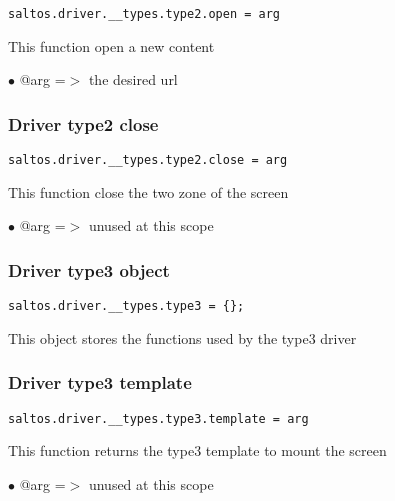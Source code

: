 \documentclass[a4paper]{article}
\begin{document}
\begin{lstlisting}
saltos.driver.__types.type2.open = arg
\end{lstlisting}

This function open a new content

\begin{compactitem}
\item[\color{myblue}$\bullet$] @arg =$>$ the desired url
\end{compactitem}

\hypertarget{toc748}{}
\subsubsection{Driver type2 close}

\begin{lstlisting}
saltos.driver.__types.type2.close = arg
\end{lstlisting}

This function close the two zone of the screen

\begin{compactitem}
\item[\color{myblue}$\bullet$] @arg =$>$ unused at this scope
\end{compactitem}

\hypertarget{toc749}{}
\subsubsection{Driver type3 object}

\begin{lstlisting}
saltos.driver.__types.type3 = {};
\end{lstlisting}

This object stores the functions used by the type3 driver

\hypertarget{toc750}{}
\subsubsection{Driver type3 template}

\begin{lstlisting}
saltos.driver.__types.type3.template = arg
\end{lstlisting}

This function returns the type3 template to mount the screen

\begin{compactitem}
\item[\color{myblue}$\bullet$] @arg =$>$ unused at this scope
\end{compactitem}
\end{document}
